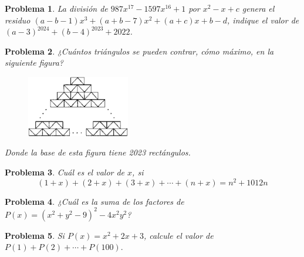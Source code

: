\documentclass[12pt]{beamer}
\newtheorem{section-problem}{Problema}
\begin{document}
   \begin{frame}
      \begin{section-problem}
         La división de $987x^{17} - 1597x^{16} + 1$ por $x^2 - x + c$ genera el residuo $(a - b - 1)x^3 + (a + b - 7)x^2 + (a + c)x + b - d$, indique el valor de $(a - 3)^{2024} + (b - 4)^{2023} + 2022$.
      \end{section-problem}
   \end{frame}

   \begin{frame}
      \begin{section-problem}
         ¿Cuántos triángulos se pueden contrar, cómo máximo, en la siguiente figura?
         \begin{figure}[htb]
            \centering
            \includegraphics[width=4.5cm]{figura}
         \end{figure}
         Donde la base de esta figura tiene 2023 rectángulos.
      \end{section-problem}
   \end{frame}

   \begin{frame}
      \begin{section-problem}
         Cuál es el valor de $x$, si
         \[(1 + x) + (2 + x) + (3 + x) + \cdots + (n + x) = n^2 + 1012n\]
      \end{section-problem}
   \end{frame}

   \begin{frame}
      \begin{section-problem}
         ¿Cuál es la suma de los factores de $P(x) = (x^2 + y^2 - 9)^2 - 4x^2 y^2$?
      \end{section-problem}
   \end{frame}

   \begin{frame}
      \begin{section-problem}
         Si $P(x) = x^2 + 2x + 3$, calcule el valor de $P(1) + P(2) + \cdots + P(100).$
      \end{section-problem}
   \end{frame}
\end{document}

